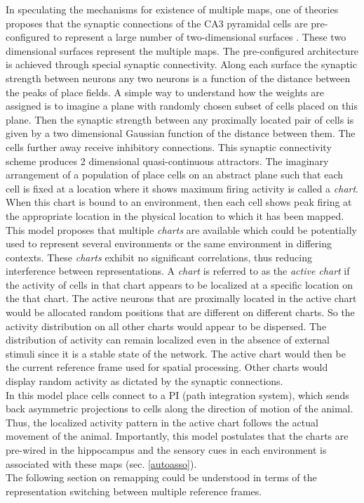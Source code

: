 In speculating the mechanisms for existence of multiple maps, one of theories proposes that the synaptic connections of the CA3 pyramidal cells are pre-configured to represent a large number of two-dimensional surfaces \cite{Samsonovich1997}. These two dimensional surfaces represent the multiple maps. The pre-configured architecture is achieved through special synaptic connectivity. Along each surface the synaptic strength between neurons any two neurons is a function of the distance between the peaks of place fields.  %
A simple way to understand how the weights are assigned is to imagine a plane with randomly chosen subset of cells placed on this plane. Then the synaptic strength between any proximally located pair of cells is given by a two dimensional Gaussian function of the distance between them. The cells further away receive inhibitory connections. This synaptic connectivity scheme produces 2 dimensional quasi-continuous attractors. The imaginary arrangement of a population of place cells on an abstract plane such that each  cell is fixed at a location where it shows maximum firing activity is called a \emph{chart}. When this chart is bound to an environment, then each cell shows peak firing at the appropriate location in the physical location to which it has been mapped. This model proposes that multiple \emph{charts} are available which could be potentially used to represent several environments or the same environment in differing contexts. These \emph{charts} exhibit no significant correlations, thus reducing  interference between representations. A \emph{chart} is referred to as the \emph{active chart} if the activity of cells in that chart appears to be localized at a specific location on the that chart. The active neurons that are proximally located in the active chart would be allocated random positions that are different on different charts. So the activity distribution on all other charts would appear to be dispersed. The distribution of activity can remain localized even in the absence of external stimuli since it is a stable state of the network. The active chart would then be the current reference frame used for spatial processing. Other charts would display random activity as dictated by the synaptic connections. \\
In this model place cells connect to a PI (path integration system), which sends back asymmetric projections to cells along the direction of motion of the animal. Thus, the localized activity pattern in the active chart follows the actual movement of the animal. Importantly, this model postulates that the charts are pre-wired in the hippocampus and the sensory cues in each environment is associated with these maps (sec. \ref{autoasso}).\\
The following section on remapping could be understood in terms of the representation switching between multiple reference frames. 
